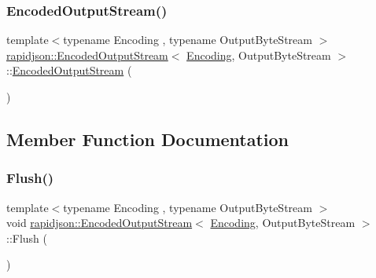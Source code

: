 \subsubsection{\texorpdfstring{EncodedOutputStream()}{EncodedOutputStream()}\hspace{0.1cm}{\footnotesize\ttfamily [2/2]}}
{\footnotesize\ttfamily template$<$typename Encoding , typename Output\+Byte\+Stream $>$ \\
\mbox{\hyperlink{classrapidjson_1_1_encoded_output_stream}{rapidjson\+::\+Encoded\+Output\+Stream}}$<$ \mbox{\hyperlink{classrapidjson_1_1_encoding}{Encoding}}, Output\+Byte\+Stream $>$\+::\mbox{\hyperlink{classrapidjson_1_1_encoded_output_stream}{Encoded\+Output\+Stream}} (\begin{DoxyParamCaption}\item[{const \mbox{\hyperlink{classrapidjson_1_1_encoded_output_stream}{Encoded\+Output\+Stream}}$<$ \mbox{\hyperlink{classrapidjson_1_1_encoding}{Encoding}}, Output\+Byte\+Stream $>$ \&}]{ }\end{DoxyParamCaption})\hspace{0.3cm}{\ttfamily [private]}}



\subsection{Member Function Documentation}
\mbox{\label{classrapidjson_1_1_encoded_output_stream_a725ecc2947f20d49b8dc0baf93929923}} 
\subsubsection{\texorpdfstring{Flush()}{Flush()}}
{\footnotesize\ttfamily template$<$typename Encoding , typename Output\+Byte\+Stream $>$ \\
void \mbox{\hyperlink{classrapidjson_1_1_encoded_output_stream}{rapidjson\+::\+Encoded\+Output\+Stream}}$<$ \mbox{\hyperlink{classrapidjson_1_1_encoding}{Encoding}}, Output\+Byte\+Stream $>$\+::Flush (\begin{DoxyParamCaption}{ }\end{DoxyParamCaption})}



